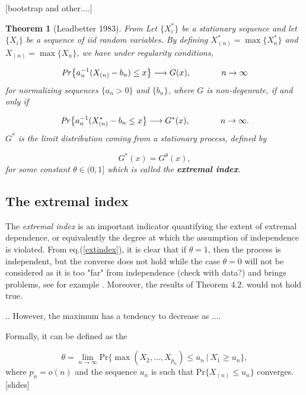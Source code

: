 \documentclass[11pt,a4paper,openany ]{book}
\newtheorem{theorem}{Theorem}[chapter]
\begin{document}
[bootstrap and other....]


\begin{theorem}[Leadbetter 1983]
	From \cite[pp.]{coles_introduction_2001} 
	Let $\{X^*_i\}$ be a stationary sequence and let $\{X_i\}$ be a sequence of iid random variables. By defining  $X^*_{(n)}=\max  \{X^*_n\}$ and $X_{(n)}=\max \{X_n\}$, we have under regularity conditions, 
	
	\begin{equation*}
	\text{\emph{Pr}}\big\{a_n^{-1}(X_{(n)}-b_n)\leq x\big\}\longrightarrow G(x), \ \ \ \ \ \ \ \ \ \ \ n\rightarrow \infty
	\end{equation*}
	for normalizing sequences $\{a_n>0\}$ and $\{b_n\}$, where $G$ is non-degenrate, if and only if 
	
	\begin{equation*}\label{extremindex}
	\text{\emph{Pr}}\big\{a_n^{-1}(X^*_{(n)}-b_n\leq x \big\}\longrightarrow G^*(x), \ \ \ \ \ \ \ \ \ \ \  n\rightarrow\infty.
	\end{equation*}
	$G^*$ is the limit distribution coming from a stationary process, defined by
	
	\begin{equation}\label{extindex}
	G^*(x)=G^{\theta}(x),
	\end{equation}
	for some constant $\theta\in (0,1]$ which is called the \emph{\textbf{extremal index}}.
	
\end{theorem}

\subsection{The extremal index}
The \emph{extremal index} is an important indicator quantifying the extent of extremal dependence, or equivalently the degree at which the assumption of independence is violated. From eq.(\ref{extindex}), it is clear that if  $\theta=1$, then the process is independent, but the converse does not hold while the case $\theta= 0$ will not be considered as it is too "far" from independence (check with data?) and brings problems, see for example \citet[pp.379-380]{beirlant_statistics_2006}. Moreover, the results of Theorem 4.2. would not hold true.

.. However, the maximum has a tendency to decrease as .... \cite[pp.96]{coles_introduction_2001}

Formally, it can be defined as the 

\begin{equation}\label{exc}
\theta=\displaystyle{\lim_{n \to \infty}}\text{Pr}\big\{\max(X_2,\dots,X_{p_n})\leq u_n\ | \ X_1\geq u_n\big\},
\end{equation}
where $p_n=o(n)$ and the sequence $u_n$ is such that Pr$\big\{X_{(n)} \leq u_n\big\}$ converges. \cite{coles_introduction_2001}[slides]
\end{document}
